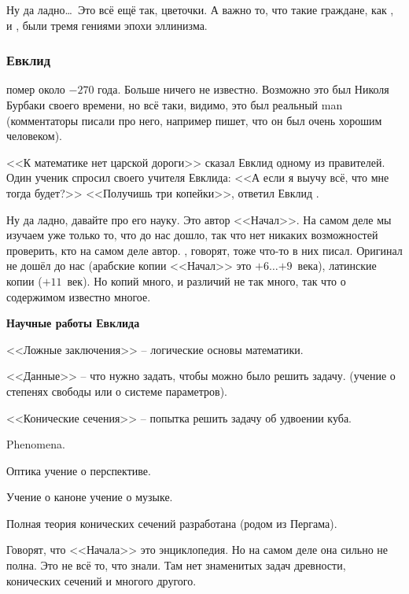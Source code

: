 \documentclass[a4paper,oneside,fleqn,10pt]{article}
\newcommand{\pe}[2]{${#1}\ldots{#2}$}
\begin{document}
Ну да ладно\ldots\ Это всё ещё так, цветочки. А важно то, что такие
граждане, как ,  и , были
тремя гениями эпохи эллинизма.

\subsubsection{Евклид}

 помер около $-270$ года. Больше ничего не известно.
Возможно это был Николя Бурбаки своего времени, но всё таки, видимо,
это был реальный man (комментаторы писали про него, например
 пишет, что он был очень хорошим человеком).

<<К математике нет царской дороги>> сказал Евклид одному из
правителей.  Один ученик спросил своего учителя Евклида: <<А если я
выучу всё, что мне тогда будет?>> <<Получишь три копейки>>, ответил
Евклид .

Ну да ладно, давайте про его науку.  Это автор <<Начал>>. На самом
деле мы изучаем уже только то, что до нас дошло, так что нет никаких
возможностей проверить, кто на самом деле автор.  , говорят, тоже что-то в них писал. Оригинал не дошёл до
нас (арабские копии <<Начал>> это \pe{+6}{+9}~века), латинские копии
($+11$~век).  Но копий много, и различий не так много, так что о
содержимом известно многое.

\textbf{Научные работы Евклида}

\begin{items}{-2}
\item <<Ложные заключения>> -- логические основы математики.
\item <<Данные>> -- что нужно задать, чтобы можно было решить задачу.
  (учение о степенях свободы или о системе параметров).
\item <<Конические сечения>> -- попытка решить задачу об удвоении
  куба.
\item Phenomena.
\item Оптика учение о перспективе.
\item Учение о каноне учение о музыке.
\end{items}

Полная теория конических сечений разработана  (родом из Пергама).

Говорят, что <<Начала>> это энциклопедия. Но на самом деле она сильно
не полна. Это не всё то, что знали. Там нет знаменитых задач
древности, конических сечений и многого другого.
\end{document}
